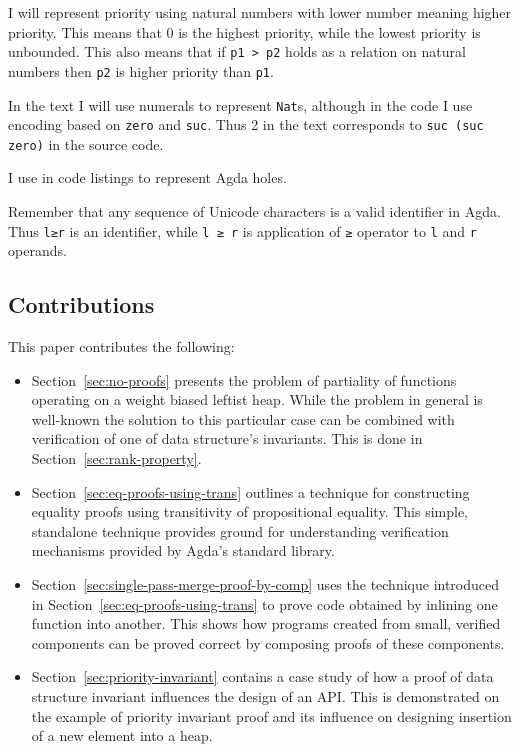 I will represent priority using natural numbers with lower number meaning higher priority. This means that 0 is the highest priority, while the lowest priority is unbounded. This also means that if \texttt{p1 > p2} holds as a relation on natural numbers then \texttt{p2} is higher priority than \texttt{p1}.

In the text I will use numerals to represent \texttt{Nat}s, although in the code I use encoding based on \texttt{zero} and \texttt{suc}. Thus 2 in the text corresponds to \texttt{suc (suc zero)} in the source code.

I use \texttt{} in code listings to represent Agda holes.

Remember that any sequence of Unicode characters is a valid identifier in Agda. Thus \texttt{l≥r} is an identifier, while \texttt{l ≥ r} is application of \texttt{≥} operator to \texttt{l} and \texttt{r} operands.

\subsection{Contributions}

This paper contributes the following:

\begin{itemize}
 \item Section~\ref{sec:no-proofs} presents the problem of partiality of functions operating on a weight biased leftist heap. While the problem in general is well-known the solution to this particular case can be combined with verification of one of data structure's invariants. This is done in Section~\ref{sec:rank-property}.
 \item Section~\ref{sec:eq-proofs-using-trans} outlines a technique for constructing equality proofs using transitivity of propositional equality. This simple, standalone technique provides ground for understanding verification mechanisms provided by Agda's standard library.
 \item Section~\ref{sec:single-pass-merge-proof-by-comp} uses the technique introduced in Section~\ref{sec:eq-proofs-using-trans} to prove code obtained by inlining one function into another. This shows how programs created from small, verified components can be proved correct by composing proofs of these components.
 \item Section~\ref{sec:priority-invariant} contains a case study of how a proof of data structure invariant influences the design of an API. This is demonstrated on the example of priority invariant proof and its influence on designing insertion of a new element into a heap.
\end{itemize}
